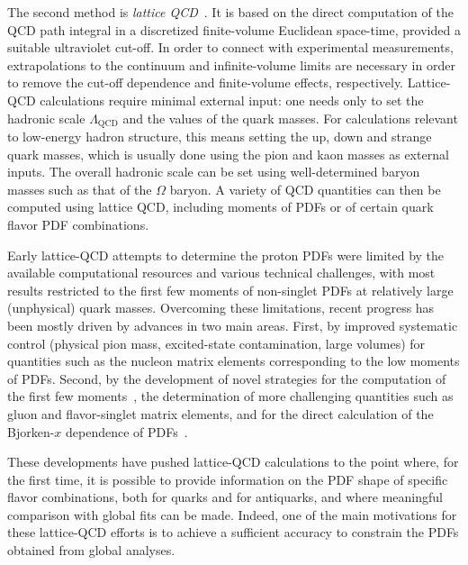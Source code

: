 The second method is {\it lattice QCD}~\cite{Olive:2016xmw,Gupta:1997nd}.
%
It is based on the direct computation of the QCD path integral in a 
discretized finite-volume Euclidean space-time, provided a suitable ultraviolet
cut-off.
%
In order to connect with experimental measurements, extrapolations to the 
continuum and infinite-volume limits are necessary in order to remove the  
cut-off dependence and finite-volume effects, respectively.
%
Lattice-QCD calculations require minimal external input: one needs only to 
set the hadronic scale $\Lambda_\text{QCD}$ and the values of the quark masses.
%
For calculations relevant to low-energy hadron structure, this means
setting the up, down and strange quark masses,
which is usually done using the pion and kaon masses as external inputs.
%
The overall hadronic scale can be set using well-determined baryon masses 
such as that of the $\Omega$ baryon.
%
A variety of QCD quantities can then be computed using lattice QCD, including
moments of PDFs or of certain quark flavor PDF combinations.

Early lattice-QCD attempts to determine the proton PDFs were limited by the 
available computational resources and various technical challenges, with most 
results restricted to the first few moments of non-singlet PDFs at relatively 
large (unphysical) quark masses.
%
Overcoming these limitations, recent progress has been mostly
driven by advances in two main areas. 
%
First, by improved systematic control (physical pion mass, excited-state 
contamination, large volumes) for quantities such as the nucleon matrix 
elements corresponding to the low moments of PDFs.
%
Second, by the  development of novel strategies
for the computation of the first few 
moments~\cite{Constantinou:2014tga,Syritsyn:2014saa,Lin:2012ev},
the determination of more challenging quantities 
such as gluon and flavor-singlet matrix elements, and
for the direct calculation of the 
Bjorken-$x$ dependence of PDFs~\cite{Lin:2014zya,Alexandrou:2015rja,
Chen:2016utp,Alexandrou:2016jqi}.

These developments have pushed lattice-QCD calculations to the point where, 
for the first time, it is possible to provide information on the PDF shape
of specific flavor combinations, both for quarks and for antiquarks, 
and where meaningful comparison with global fits can be made.
%
Indeed, one of the main motivations for these lattice-QCD efforts is to 
achieve a sufficient accuracy to constrain the PDFs obtained from global 
analyses.

